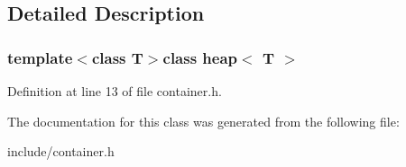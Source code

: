 \subsection{Detailed Description}
\subsubsection*{template$<$class T$>$class heap$<$ T $>$}



Definition at line 13 of file container.\+h.



The documentation for this class was generated from the following file\+:\begin{DoxyCompactItemize}
\item 
include/container.\+h\end{DoxyCompactItemize}
